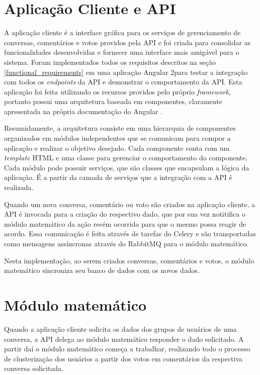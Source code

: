   \section{Aplicação Cliente e API}
    
    A aplicação cliente é a interface gráfica para os serviços de 
    gerenciamento de conversas, comentários e votos providos pela API e foi
    criada para consolidar as funcionalidades desenvolvidas e fornecer uma interface mais
    amigável para o sistema. Foram implementados todos os requisitos descritos na seção \ref{functional_requirements}
    em uma aplicação Angular 2\footnotemark para
    testar a integração com todos os \textit{endpoints} da API e demonstrar o comportamento da API. Esta aplicação foi feita utilizando os recursos providos pelo próprio \textit{framework}, portanto
    possui uma arquitetura baseada em componentes, claramente apresentada na própria documentação do Angular \footnotemark.
    
    Resumidamente, a arquitetura consiste em uma hierarquia de componentes organizados
    em módulos independentes que se comunicam para compor a aplicação e realizar o objetivo desejado.
    Cada componente conta com um \textit{template} HTML e uma classe para gerenciar o comportamento do componente.
    Cada módulo pode possuir serviços, que são classes que encapsulam a lógica da aplicação.
    É a partir da camada de serviços que a integração com a API é realizada.
    
    Quando um nova conversa, comentário ou voto são criados na aplicação cliente,
    a API é invocada para a criação do respectivo dado, que por sua vez
    notitifica o módulo matemático da ação recém ocorrida para que o mesmo possa reagir de acordo.
    Essa comunicação é feita através de tarefas do Celery e são transportadas como mensagens assíncronas
    através do RabbitMQ para o módulo matemático.
    
    Nesta implementação, ao serem criados conversas, comentários e votos, o módulo matemático
    sincroniza seu banco de dados com os novos dados.
  
  \section{Módulo matemático}
     
    Quando a aplicação cliente solicita os dados dos grupos de usuários de uma conversa,
    a API delega ao módulo matemático responder o dado solicitado. A partir daí o módulo
    matemático começa a trabalhar, realizando todo o processo de clusterização dos usuários
    a partir dos votos em comentários da respectiva conversa solicitada.
    
